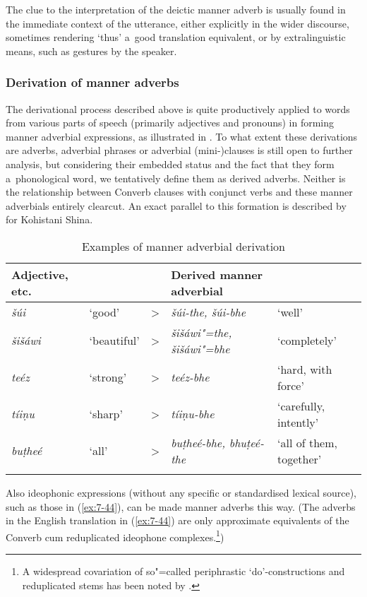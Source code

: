 The clue to the interpretation of the deictic manner adverb is usually found in the immediate context of the utterance, either explicitly in the wider discourse, sometimes rendering `thus' a~good translation equivalent, or by extralinguistic means, such as gestures by the speaker. 


\subsubsection*{Derivation of manner adverbs}

The derivational process described above is quite productively applied to words from various parts
of speech (primarily adjectives and pronouns) in forming manner adverbial expressions, as
illustrated in . To what extent these derivations are adverbs, adverbial phrases or
adverbial (mini-)clauses is still open to further analysis, but considering their embedded status
and the fact that they form a~phonological word, we tentatively define them as derived
adverbs. Neither is the relationship between Converb clauses with conjunct verbs and these manner
adverbials entirely clearcut. An exact parallel to this formation is described by
\citet[219]{schmidtkohistani2008} for Kohistani Shina.


\begin{table}[ht]
\caption{Examples of manner adverbial derivation}

\begin{tabularx}{\textwidth}{ P{17mm} l l Q Q }
\lsptoprule
Adjective, etc. &
&
&
Derived manner adverbial &
\\\hline
\textit{šúi} &
`good' &
{\textgreater} &
\textit{šúi-the, šúi-bhe} &
`well'\\
\textit{šišáwi} &
`beautiful' &
{\textgreater} &
\textit{šišáwi"=the, šišáwi"=bhe} &
`completely'\\
\textit{teéz} &
`strong' &
{\textgreater} &
\textit{teéz-bhe} &
`hard, with force'\\
\textit{tíiṇu} &
`sharp' &
{\textgreater} &
\textit{tíiṇu-bhe} &
`carefully, intently'\\
\textit{buṭheé} &
`all' &
{\textgreater} &
\textit{buṭheé-bhe, bhuṭeé-the} &
`all of them, together'\\\lspbottomrule
\end{tabularx}
\label{tab:7-3}
\end{table}


Also ideophonic expressions (without any specific or standardised lexical source), such as those in (\ref{ex:7-44}), can be made manner adverbs this way. (The adverbs in the English translation in (\ref{ex:7-44}) are only approximate equivalents of the Converb cum reduplicated ideophone complexes.\footnote{A widespread covariation of so"=called periphrastic `do'-constructions and reduplicated stems has been noted by \citet{jaeger2006}.})

